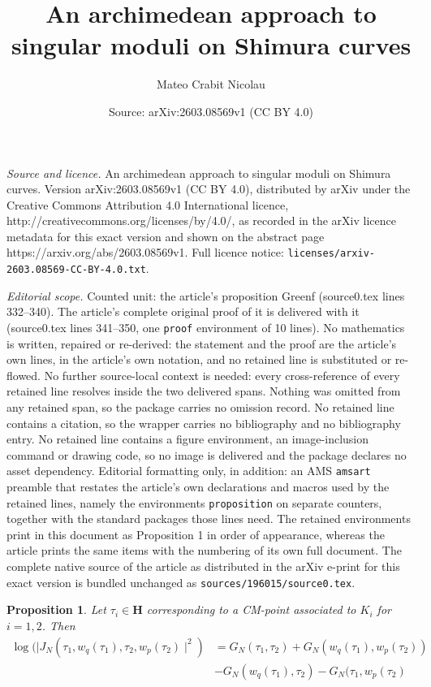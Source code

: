 \documentclass[10pt,a4paper]{amsart}
\title{An archimedean approach to singular moduli on Shimura curves}
\author{Mateo Crabit Nicolau}
\date{Source: arXiv:2603.08569v1 (CC BY 4.0)}
\newtheorem{proposition}{Proposition}
\begin{document}
\maketitle

\noindent\emph{Source and licence.} An archimedean approach to singular moduli on Shimura curves. Version arXiv:2603.08569v1 (CC BY 4.0), distributed by arXiv under the Creative Commons Attribution 4.0 International licence, http://creativecommons.org/licenses/by/4.0/, as recorded in the arXiv licence metadata for this exact version and shown on the abstract page https://arxiv.org/abs/2603.08569v1. Full licence notice: \texttt{licenses/arxiv-2603.08569-CC-BY-4.0.txt}.\par\smallskip

\noindent\textit{Editorial scope.} Counted unit: the article's proposition Greenf (source0.tex lines 332--340). The article's complete original proof of it is delivered with it (source0.tex lines 341--350, one \texttt{proof} environment of 10 lines). No mathematics is written, repaired or re-derived: the statement and the proof are the article's own lines, in the article's own notation, and no retained line is substituted or re-flowed.  No further source-local context is needed: every cross-reference of every retained line resolves inside the two delivered spans.  Nothing was omitted from any retained span, so the package carries no omission record.  No retained line contains a citation, so the wrapper carries no bibliography and no bibliography entry.  No retained line contains a figure environment, an image-inclusion command or drawing code, so no image is delivered and the package declares no asset dependency.  Editorial formatting only, in addition: an AMS \texttt{amsart} preamble that restates the article's own declarations and macros used by the retained lines, namely the environments \texttt{proposition} on separate counters, together with the standard packages those lines need.  The retained environments print in this document as Proposition 1 in order of appearance, whereas the article prints the same items with the numbering of its own full document.  The complete native source of the article as distributed in the arXiv e-print for this exact version is bundled unchanged as \texttt{sources/196015/source0.tex}.
\begin{proposition}\label{Greenf}
    Let $\tau_i\in \mathbf{H}$ corresponding to a CM-point associated to $K_i$ for $i=1,2$. Then
    \begin{equation}
    \begin{split}
        \log(\mid J_N(\tau_1,w_q(\tau_1),\tau_2,w_p(\tau_2)\mid^2)&=G_N(\tau_1,\tau_2)+G_N(w_q(\tau_1),w_p(\tau_2))
        \\&-G_N(w_q(\tau_1),\tau_2)-G_N(\tau_1,w_p(\tau_2)
        \end{split}
    \end{equation}
\end{proposition}
\end{document}
